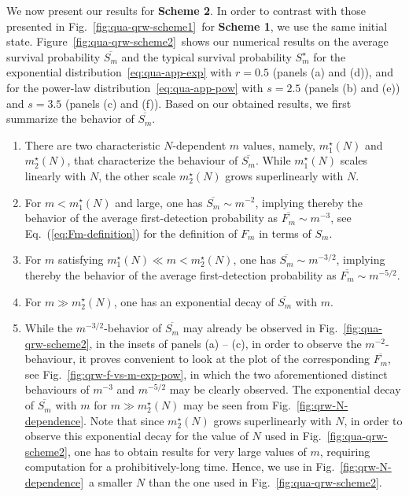 \documentclass[12pt]{iopart}
\begin{document}
We now present our results for {\bf Scheme 2}. In order to contrast with those presented in Fig.~\ref{fig:qua-qrw-scheme1}\, for {\bf Scheme 1}, we use the same initial state.  Figure~\ref{fig:qua-qrw-scheme2}\, 
shows our numerical results on the average survival probability
$\overline{S_m}$ and the typical survival probability $S_m^\star$ for the exponential
distribution~\eqref{eq:qua-app-exp} with $r=0.5$ (panels (a) and (d)),
and for the power-law distribution~\eqref{eq:qua-app-pow} with $s=2.5$ (panels (b) and (e)) and $s=3.5$ (panels (c) and (f)).  Based on our obtained results, we first summarize the behavior of $\overline{S_m}$.
\begin{enumerate}
\item There are two characteristic $N$-dependent $m$ values, namely, $m_1^\star(N)$ and $m_2^\star(N)$, that characterize the behaviour of $\overline{S_m}$.  While $m_1^\star(N)$ scales linearly with $N$, the other scale $m_2^\star(N)$ grows superlinearly with $N$.
\item For $m < m_1^\star(N)$ and large, one has $\overline{S_m} \sim m^{-2}$, implying  thereby the behavior of the average first-detection probability as $\overline{F_m} \sim m^{-3}$,  see Eq.~(\ref{eq:Fm-definition}) for the definition of $F_m$ in terms of $S_m$.  
\item For $m$ satisfying $m_1^\star(N) \ll m < m_2^\star(N)$, one has $\overline{S_m} \sim m^{-3/2}$, implying  thereby the behavior of the average first-detection probability as $\overline{F_m} \sim m^{-5/2}$.  
\item For $m \gg m_2^\star(N)$, one has an exponential decay of $\overline{S_m}$ with $m$.
\item While the $m^{-3/2}$-behavior of $\overline{S_m}$ may already be observed in Fig.~\ref{fig:qua-qrw-scheme2},  in the insets of panels (a) -- (c),  in order to observe the $m^{-2}$-behaviour, it proves convenient to look at the plot of the corresponding $\overline{F_m}$, see Fig.~\ref{fig:qrw-f-vs-m-exp-pow}, in which the two aforementioned distinct behaviours of $m^{-3}$ and $m^{-5/2}$ may be clearly observed.  The exponential decay of $\overline{S_m}$ with $m$ for $m \gg m_2^\star(N)$ may be seen from Fig.~\ref{fig:qrw-N-dependence}.  Note that since $m_2^\star(N)$ grows superlinearly with $N$, in order to observe this exponential decay for the value of $N$ used in Fig.~\ref{fig:qua-qrw-scheme2}, one has to obtain results for very large values of $m$,  requiring computation for a prohibitively-long time.  Hence, we use in Fig.~\ref{fig:qrw-N-dependence}\, a smaller $N$ than the one used  in Fig.~\ref{fig:qua-qrw-scheme2}.

\end{enumerate}
\end{document}
